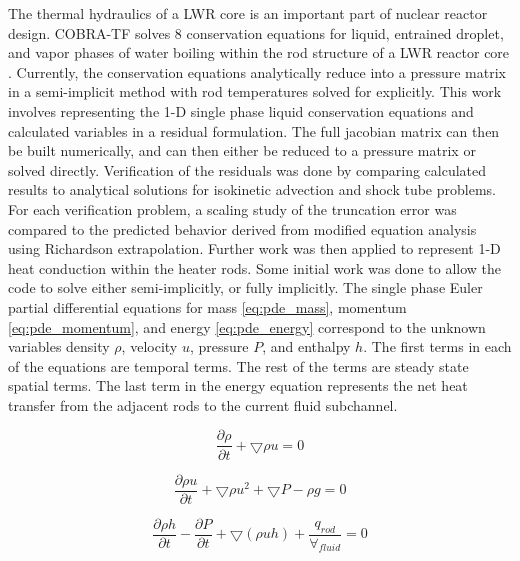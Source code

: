 	The thermal hydraulics of a LWR core is an important part of nuclear
	reactor design. COBRA-TF solves 8 conservation equations for liquid,
	entrained droplet, and vapor phases of water boiling within the rod structure
	of a LWR reactor core \cite{Salko2014}. Currently, the conservation
	equations analytically reduce into a pressure matrix in a semi-implicit
	method with rod temperatures solved for explicitly. This work involves
	representing the 1-D single phase liquid conservation equations and calculated 
	variables in a residual formulation. The full jacobian matrix can then be
	built numerically, and  can then either be reduced to a pressure matrix or
	solved directly. Verification of the residuals was done by comparing
	calculated results to analytical solutions for isokinetic advection and shock
	tube problems. For each verification problem, a scaling study of the
	truncation error was compared to the predicted behavior derived from modified
	equation analysis using Richardson extrapolation. Further work was then
	applied to represent 1-D heat conduction within the heater rods. Some initial
	work was done to allow the code to solve either semi-implicitly, or fully
	implicitly. The single phase Euler partial differential equations for mass
    \eqref{eq:pde_mass}, momentum \eqref{eq:pde_momentum}, and energy
    \eqref{eq:pde_energy} correspond to the unknown variables density $\rho$,
    velocity $u$, pressure $P$, and enthalpy $h$. The first terms in each of the
    equations are temporal terms. The rest of the terms are steady state spatial
    terms. The last term in the energy equation represents the net heat transfer
    from the adjacent rods to the current fluid subchannel.
    
    \begin{equation}
    	\label{eq:pde_mass}
    	\frac{ \partial \rho}{\partial t} + \bigtriangledown \rho u = 0
    \end{equation}
    
    \begin{equation}
    	\label{eq:pde_momentum}
    	\frac{ \partial \rho u}{\partial t} + \bigtriangledown \rho u^{2} +
    	\bigtriangledown P - \rho g  = 0
    \end{equation}
    
    \begin{equation}
    	\label{eq:pde_energy}
    	\frac{ \partial \rho h}{\partial t} -
    	\frac{ \partial  P}{\partial t} + 
    	\bigtriangledown ( \rho  u h )%
    	+ \frac{q_{rod}}{\forall_{fluid}}
    	= 0
    \end{equation}
    

